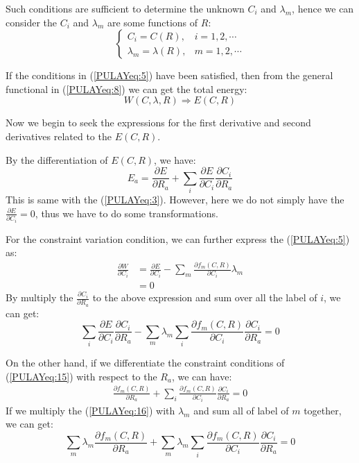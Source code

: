 Such conditions are sufficient to determine the unknown $C_{i}$ and
$\lambda_{m}$, hence we can consider the $C_{i}$ and $\lambda_{m}$ are
some functions of $R$:
\begin{equation}\label{}
  \left\{
    \begin{array}{ll}
      C_{i} = C(R),             & i=1,2,\cdots  \\
      \lambda_{m} = \lambda(R), & m=1,2,\cdots
    \end{array}
  \right.
\end{equation}

If the conditions in (\ref{PULAYeq:5}) have been satisfied, then from
the general functional in (\ref{PULAYeq:8}) we can get the total
energy:
\begin{equation}\label{PULAYeq:4}
  W(C, \lambda, R) \Rightarrow E(C, R)
\end{equation}

Now we begin to seek the expressions for the first derivative and
second derivatives related to the $E(C,R)$.

By the differentiation of $E(C,R)$, we have:
\begin{equation}\label{PULAYeq:6}
  E_{a} =\frac{\partial E}{\partial R_{a}} + \sum_{i}\frac{\partial
    E}{\partial C_{i}}\frac{\partial C_{i}}{\partial R_{a}}
\end{equation}
This is same with the (\ref{PULAYeq:3}). However, here we do not
simply have the $\frac{\partial E}{\partial C_{i}} = 0$, thus we have
to do some transformations.

For the constraint variation condition, we can further express the
(\ref{PULAYeq:5}) as:
\begin{align}\label{}
  \frac{\partial W}{\partial C_{i}} &= \frac{\partial E}{\partial
    C_{i}} - \sum_{m}\frac{\partial f_{m}(C,R)}{\partial
    C_{i}}\lambda_{m} \nonumber \\
  &= 0
\end{align}
By multiply the $\frac{\partial C_{i}}{\partial R_{a}}$ to the above
expression and sum over all the label of $i$, we can get:
\begin{equation}\label{PULAYeq:17}
  \sum_{i}\frac{\partial E}{\partial C_{i}}\frac{\partial
    C_{i}}{\partial R_{a}} - \sum_{m}\lambda_{m}\sum_{i}\frac{\partial
    f_{m}(C,R)}{\partial C_{i}}\frac{\partial C_{i}}{\partial R_{a}} = 0
\end{equation}

On the other hand, if we differentiate the constraint conditions of
(\ref{PULAYeq:15}) with respect to the $R_{a}$, we can have:
\begin{align}\label{PULAYeq:16}
  \frac{\partial f_{m}(C,R)}{\partial R_{a}} + \sum_{i}\frac{\partial
    f_{m}(C,R)}{\partial C_{i}}\frac{\partial C_{i}}{\partial R_{a}} =
  0
\end{align}
If we multiply the (\ref{PULAYeq:16}) with $\lambda_{m}$ and sum all
of label of $m$ together, we can get:
\begin{equation}\label{PULAYeq:18}
  \sum_{m}\lambda_{m}\frac{\partial f_{m}(C,R)}{\partial R_{a}} +
  \sum_{m}\lambda_{m}\sum_{i}\frac{\partial f_{m}(C,R)}{\partial
    C_{i}}\frac{\partial C_{i}}{\partial R_{a}} = 0
\end{equation}

